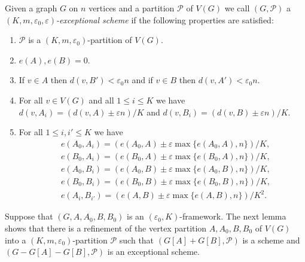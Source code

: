 \documentclass{memo-l}
\def\COMMENT#1{}
\def\eps{\varepsilon}
\def\epszero{\eps_0}
\numberwithin{section}{chapter}
\numberwithin{equation}{section}
\numberwithin{firstthm}{section}
\numberwithin{figure}{section}
\begin{document}
Given a graph $G$ on $n$ vertices and a partition $\mathcal P$ of $V(G)$ we call
$(G, \mathcal{P})$ a \emph{$(K,  m, \epszero,\eps)$-exceptional scheme} if the following properties are satisfied:
\begin{enumerate}[label={(ESch{\arabic*})}]
	\item $\mathcal P$ is a $(K, m, \epszero)$-partition of $V(G)$.
	\item $e(A),e(B) = 0$.
	\item If $v\in A$ then $d(v, B')< \epszero n$ and if $v\in B$ then $d(v, A')< \epszero n$.%
	\COMMENT{Previously had "If $d(v,A'), d(v,B') \ge \epszero n$, then $v \in V_0$". But this doesn't seem to be strong enough.
Also, note that there is no condition on $\Delta(G[A',B'])$ in the definition of exceptional scheme.}
	\item For all $v \in V(G)$ and all $1\le i \le K$ we have
    $d(v, A_i) = ( d(v,A) \pm\eps n ) / K$ and $d(v,B_i) = ( d(v,B) \pm\eps n ) / K$.
	\item For all $1\le i,i' \le K$ we have
	\begin{align*}
	&e(A_0,A_i)  = ( e(A_0,A) \pm \eps \max \{ e(A_0,A) , n \}     )/K ,\\
   &e(B_0,A_i)  = ( e(B_0,A) \pm \eps \max \{ e(B_0,A) , n \}     )/K ,\\
	&e(A_0,B_i)  = ( e(A_0,B) \pm \eps \max \{ e(A_0,B) , n \}     )/K ,\\
	&e(B_0,B_i)  = ( e(B_0,B) \pm \eps \max \{ e(B_0,B) , n \}     )/K ,\\
	&e(A_i,B_{i'})  = ( e(A,B) \pm \eps \max \{ e(A,B) , n \}     )/K^2 .
	\end{align*}
\end{enumerate}



Suppose that $(G,A,A_0,B,B_0)$ is an $(\epszero, K)$-framework.
The next lemma shows that there is a refinement of the vertex partition $A,A_0,B,B_0$ of $V(G)$ into a $(K, m, \epszero)$-partition $\mathcal{P}$
such that $(G[A] +G[B], \mathcal{P})$ is a scheme and $(G - G[A]  - G[B], \mathcal{P})$ is an exceptional scheme.
\end{document}
